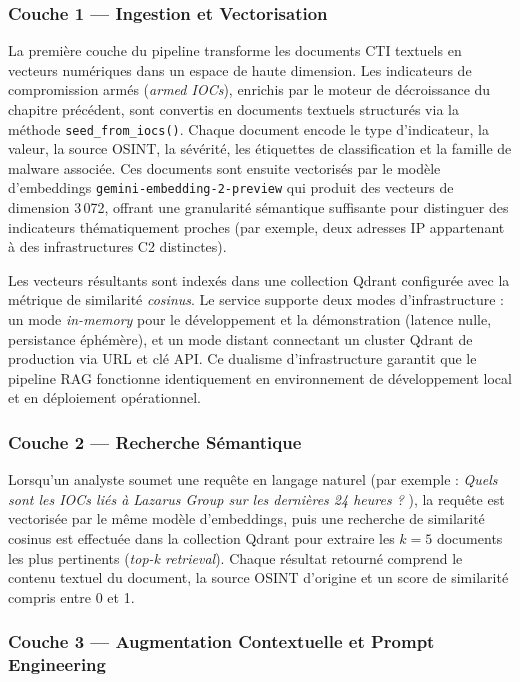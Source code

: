 \subsubsection{Couche 1 --- Ingestion et Vectorisation}

La première couche du pipeline transforme les documents CTI textuels en vecteurs numériques dans un espace de haute dimension. Les indicateurs de compromission armés (\textit{armed IOCs}), enrichis par le moteur de décroissance du chapitre précédent, sont convertis en documents textuels structurés via la méthode \texttt{seed\_from\_iocs()}. Chaque document encode le type d'indicateur, la valeur, la source OSINT, la sévérité, les étiquettes de classification et la famille de malware associée. Ces documents sont ensuite vectorisés par le modèle d'embeddings \texttt{gemini-embedding-2-preview} qui produit des vecteurs de dimension 3\,072, offrant une granularité sémantique suffisante pour distinguer des indicateurs thématiquement proches (par exemple, deux adresses IP appartenant à des infrastructures C2 distinctes).

Les vecteurs résultants sont indexés dans une collection Qdrant configurée avec la métrique de similarité \textit{cosinus}. Le service supporte deux modes d'infrastructure : un mode \textit{in-memory} pour le développement et la démonstration (latence nulle, persistance éphémère), et un mode distant connectant un cluster Qdrant de production via URL et clé API. Ce dualisme d'infrastructure garantit que le pipeline RAG fonctionne identiquement en environnement de développement local et en déploiement opérationnel.

\subsubsection{Couche 2 --- Recherche Sémantique}

Lorsqu'un analyste soumet une requête en langage naturel (par exemple : \og \textit{Quels sont les IOCs liés à Lazarus Group sur les dernières 24 heures ?} \fg{}), la requête est vectorisée par le même modèle d'embeddings, puis une recherche de similarité cosinus est effectuée dans la collection Qdrant pour extraire les \( k = 5 \) documents les plus pertinents (\textit{top-k retrieval}). Chaque résultat retourné comprend le contenu textuel du document, la source OSINT d'origine et un score de similarité compris entre 0 et 1.

\subsubsection{Couche 3 --- Augmentation Contextuelle et Prompt Engineering}

